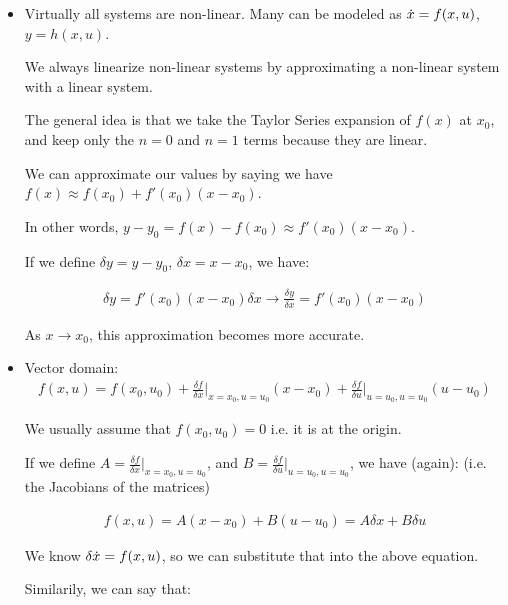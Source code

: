 \begin{enumerate}
\begin{itemize}
            \item Virtually all systems are non-linear. Many can be modeled as $\dot{x} = f(x, u)$, $y = h(x, u)$.

                We always linearize non-linear systems by approximating a non-linear system with a linear system.

                The general idea is that we take the Taylor Series expansion of $f(x)$ at $x_0$, and keep only the $n=0$ and $n=1$ terms because they are linear.

                We can approximate our values by saying we have $f(x) \approx f(x_0) + f'(x_0)(x-x_0) $.

                In other words, $y - y_0 = f(x) - f(x_0) \approx f'(x_0)(x-x_0)$.

                If we define $\delta y = y - y_0$, $\delta x = x - x_0$, we have:

                \begin{align*} \delta y = f'(x_0)(x-x_0) \delta x \to \frac{\delta y}{\delta x} = f'(x_0)(x-x_0) \end{align*}

                As $x \to x_0$, this approximation becomes more accurate.

            \item Vector domain:
                \begin{align*} f(x, u) = f(x_0, u_0) + \frac{\delta f}{\delta x} \Big|_{x=x_0, u = u_0} (x-x_0) + \frac{\delta f}{\delta u} \Big|_{u=u_0, u = u_0} (u-u_0) \end{align*}

                We usually assume that $f(x_0, u_0) = 0$ i.e. it is at the origin.

                If we define $A = \frac{\delta f}{\delta x} \Big|_{x=x_0, u = u_0}$, and $B = \frac{\delta f}{\delta u} \Big|_{u=u_0, u = u_0}$, we have (again): (i.e. the Jacobians of the matrices)

                \begin{align*} f(x, u) = A(x-x_0) + B(u-u_0) = A \delta x + B \delta u\end{align*}

                We know $\delta \dot{x} = f(x, u)$, so we can substitute that into the above equation.

                Similarily, we can say that:


\end{itemize}
\end{enumerate}
